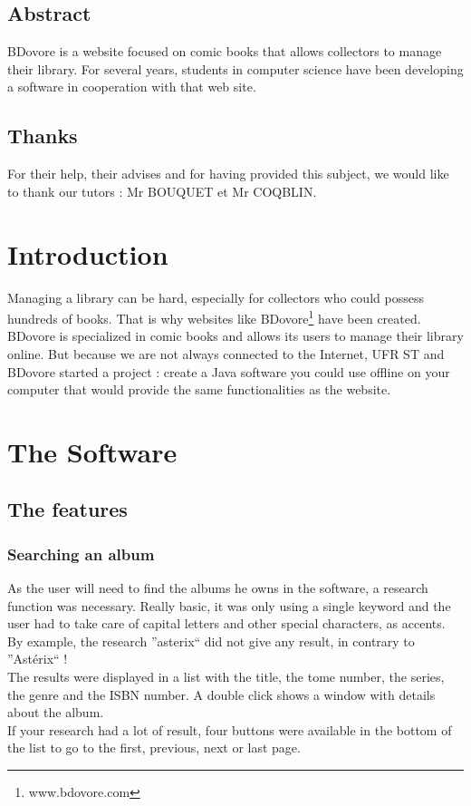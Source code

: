 \documentclass[11pt]{report} %
\begin{document}

\newpage

\section*{Abstract}
BDovore is a website focused on comic books that allows collectors to manage their library. For several years, students in computer science have been developing a software in cooperation with that web site.  
\newpage

\section*{Thanks}
For their help, their advises and for having provided this subject, we would like to thank our tutors : Mr BOUQUET et Mr COQBLIN.
\newpage

\tableofcontents
\newpage

\chapter*{Introduction}
Managing a library can be hard, especially for collectors who could possess hundreds of books. That is why websites like BDovore\footnote{www.bdovore.com} have been created. BDovore is specialized in comic books and allows its users to manage their library online. But because we are not always connected to the Internet, UFR ST and BDovore started a project : create a Java software you could use offline on your computer that would provide the same functionalities as the website.


\chapter{The Software}

\section{The features}
\subsection{Searching an album}
As the user will need to find the albums he owns in the software, a research function was necessary. Really basic, it was only using a single keyword and the user had to take care of capital letters and other special characters, as accents. By example, the research ''asterix`` did not give any result, in contrary to ''Astérix`` !\\
The results were displayed in a list with the title, the tome number, the series, the genre and the ISBN number. A double click shows a window with details about the album.\\
If your research had a lot of result, four buttons were available in the bottom of the list to go to the first, previous, next or last page.
\end{document}
